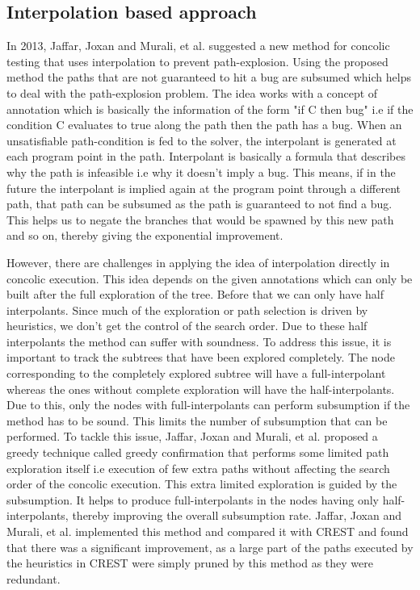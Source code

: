 \documentclass[ runningheads,
               a4paper]{llncs}
\begin{document}
\subsection{Interpolation based approach}
In 2013, Jaffar, Joxan and Murali, et al. suggested a new method \cite{jaffar2013boosting} for concolic testing that uses interpolation to prevent path-explosion. Using the proposed method the paths that are not guaranteed to hit a bug are subsumed which helps to deal with the path-explosion problem. The idea works with a concept of annotation which is basically the  information of the form "if C then bug" i.e if the condition C evaluates to true along the path then the path has a bug. When an unsatisfiable path-condition is fed to the solver, the interpolant is generated at each program point in the path. Interpolant is basically a formula that describes why the path is infeasible i.e why it doesn't imply a bug. This means, if in the future the interpolant is implied again at the program point through a different path, that path can be subsumed as the path is guaranteed to not find a bug. This helps us to negate the branches that would be spawned by this new path and so on, thereby giving the exponential improvement.


However, there are challenges \cite{jaffar2013boosting} in applying the idea of interpolation directly in concolic execution. This idea depends on the given annotations which can only be built after the full exploration of the tree. Before that we can only have half interpolants. Since much of the exploration or path selection is driven by heuristics, we don't get the control of the search order. Due to these half interpolants the method can suffer with soundness. To address this issue, it is important to track the subtrees that have been explored completely. The node corresponding to the completely explored subtree will have a full-interpolant whereas the ones without complete exploration will have the half-interpolants. Due to this, only the nodes with full-interpolants can perform subsumption if the method has to be sound. This limits the number of subsumption that can be performed. To tackle this issue, Jaffar, Joxan and Murali, et al. \cite{jaffar2013boosting} proposed a greedy technique called greedy confirmation that performs some limited path exploration itself i.e execution of few extra paths without affecting the search order of the concolic execution. This extra limited exploration is guided by the subsumption. It helps to produce full-interpolants in the nodes having only half-interpolants, thereby improving the overall subsumption rate. Jaffar, Joxan and Murali, et al. \cite{jaffar2013boosting} implemented this method and compared it with CREST
\cite{kousik2008heuristic} and found that there was a significant improvement, as a large part of the paths executed by the heuristics in CREST were simply pruned by this method as they were redundant.
\end{document}
